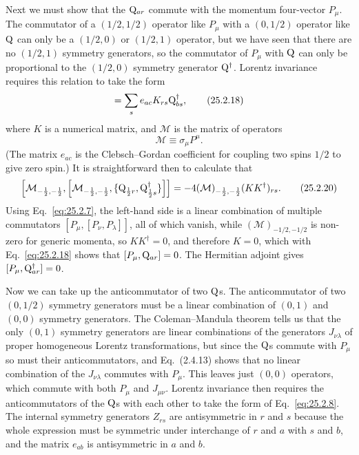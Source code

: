 Next we must show that the \(\mathrm{Q}_{ar}\) commute with the momentum
four-vector \(P_\mu\). The commutator of a \((1/2,1/2)\) operator like
\(P_\mu\) with a \((0,1/2)\) operator like \(\mathrm{Q}\) can only be a
\((1/2,0)\) or \((1/2,1)\) operator, but we have seen that there are no
\((1/2,1)\) symmetry generators, so the commutator of \(P_\mu\) with
\(\mathrm{Q}\) can only be proportional to the \((1/2,0)\) symmetry generator
\(\mathrm{Q}^\dagger\). Lorentz invariance requires this relation to take the form
\begin{equation}
[\mathcal M_{ab},\WeylQ_{cr}]
=\sum_s e_{ac}K_{rs}\WeylQ_{bs}^\dagger,
\tag{25.2.18}\label{eq:25.2.18}
\end{equation}
where \(K\) is a numerical matrix, and \(\mathcal M\) is the matrix of
operators
\begin{equation}
\mathcal M\equiv\sigma_\mu P^\mu.
\tag{25.2.19}\label{eq:25.2.19}
\end{equation}
(The matrix \(e_{ac}\) is the Clebsch--Gordan coefficient for coupling two
spins \(1/2\) to give zero spin.) It is straightforward then to calculate
that
\begin{equation}
\left[
\mathcal M_{-\frac12,-\frac12},
\left[
\mathcal M_{-\frac12,-\frac12},
\{\mathrm{Q}_{\frac12 r},\mathrm{Q}_{\frac12 s}^\dagger\}
\right]
\right]
=-4(\mathcal M)_{-\frac12,-\frac12}(KK^\dagger)_{rs}.
\tag{25.2.20}\label{eq:25.2.20}
\end{equation}
Using Eq.~\eqref{eq:25.2.7}, the left-hand side is a linear combination
of multiple commutators \([P_\mu,[P_\nu,P_\lambda]]\), all of which
vanish, while \((\mathcal M)_{-1/2,-1/2}\) is non-zero for generic
momenta, so \(KK^\dagger=0\), and therefore \(K=0\), which with
Eq.~\eqref{eq:25.2.18} shows that
\([P_\mu,\mathrm{Q}_{ar}]=0\). The Hermitian adjoint gives
\([P_\mu,\mathrm{Q}_{ar}^\dagger]=0\).

Now we can take up the anticommutator of two \(\mathrm{Q}\)s. The
anticommutator of two \((0,1/2)\) symmetry generators must be a linear
combination of \((0,1)\) and \((0,0)\) symmetry generators. The
Coleman--Mandula theorem tells us that the only \((0,1)\) symmetry
generators are linear combinations of the generators \(J_{\nu\lambda}\)
of proper homogeneous Lorentz transformations, but since the
\(\mathrm{Q}\)s commute with \(P_\mu\) so must their anticommutators, and
Eq.~(2.4.13) shows that no linear combination of the \(J_{\nu\lambda}\)
commutes with \(P_\mu\). This leaves just \((0,0)\) operators, which
commute with both \(P_\mu\) and \(J_{\mu\nu}\). Lorentz invariance then
requires the anticommutators of the \(\mathrm{Q}\)s with each other to take
the form of Eq.~\eqref{eq:25.2.8}. The internal symmetry generators
\(Z_{rs}\) are antisymmetric in \(r\) and \(s\) because the whole
expression must be symmetric under interchange of \(r\) and \(a\) with
\(s\) and \(b\), and the matrix \(e_{ab}\) is antisymmetric in \(a\) and
\(b\).

